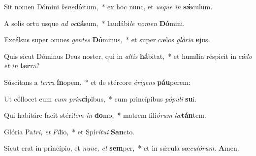 \item Sit nomen Dómini \textit{bene}\textbf{dí}ctum,~* ex hoc nunc, et \textit{usque in} \textbf{sǽ}culum.
\item A solis ortu usque \textit{ad oc}\textbf{cá}sum,~* laudábi\hspace*{0.01em}\textit{le nomen} \textbf{Dó}mini.
\item Excélsus super omnes \textit{gentes} \textbf{Dó}minus,~* et super cælos \textit{glória} \textbf{e}jus.
\item Quis sicut Dóminus Deus noster, qui in \textit{altis} \textbf{há}bitat,~* et humília réspicit in cǽ\textit{lo et in} \textbf{ter}ra?
\item Súscitans a \textit{terra} \textbf{ín}opem,~* et de stércore \textit{érigens} \textbf{páu}perem:
\item Ut cóllocet eum \textit{cum prin}\textbf{cí}pibus,~* cum princípibus \textit{pópuli} \textbf{su}i.
\item Qui habitáre facit stéri\hspace*{0.02em}\textit{lem in} \textbf{do}mo,~* matrem fili\textit{órum læ}\textbf{tán}tem.
\item Glória Pa\tinyhspace\textit{tri, et} \textit{Fí}lio,~* et Spí\textit{rítui} \textbf{San}cto.
\item Sicut erat in princípio, et \textit{nunc, et}\textbf{ sem}per,~* et in sǽcula sæ\hspace*{0.01em}\textit{culórum.} \textbf{A}men.